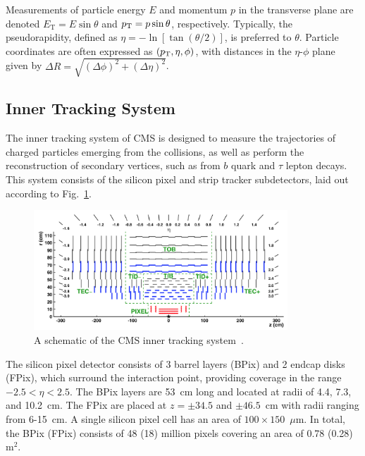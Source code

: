 Measurements of particle energy $E$ and momentum $p$ in the transverse plane are denoted $E_{\mathrm{T}} = E \sin\theta$ and $p_{\mathrm{T}} = p \sin\theta$, respectively. Typically, the pseudorapidity, defined as $\eta = - \ln[\tan(\theta/2)]$, is preferred to $\theta$. Particle coordinates are often expressed as $(p_{\mathrm{T}}, \eta, \phi)$, with distances in the $\eta$-$\phi$ plane given by $\Delta R = \sqrt{(\Delta\phi)^2 + (\Delta\eta)^2}$.


\subsection{Inner Tracking System}

The inner tracking system of CMS is designed to measure the trajectories of charged particles emerging from the collisions, as well as perform the reconstruction of secondary vertices, such as from $b$ quark and $\tau$ lepton decays. This system consists of the silicon pixel and strip tracker subdetectors, laid out according to Fig.~\ref{fig:tracker}.

\begin{figure}[!htb]
	\centering
	\includegraphics[width=0.85\textwidth]{figures/inner_tracker.png}
	\caption{A schematic of the CMS inner tracking system~\cite{Sirunyan:2018icq}.}
	\label{fig:tracker}
\end{figure}

The silicon pixel detector consists of 3 barrel layers (BPix) and 2 endcap disks (FPix), which surround the interaction point, providing coverage in the range $-2.5<\eta<2.5$. The BPix layers are 53~cm long and located at radii of 4.4, 7.3, and 10.2~cm. The FPix are placed at $z=\pm34.5$ and $\pm46.5$~cm with radii ranging from 6-15~cm. A single silicon pixel cell has an area of $100{\times}150$~$\mu$m. In total, the BPix (FPix) consists of 48 (18) million pixels covering an area of 0.78 (0.28)~$\textrm{m}^2$.


